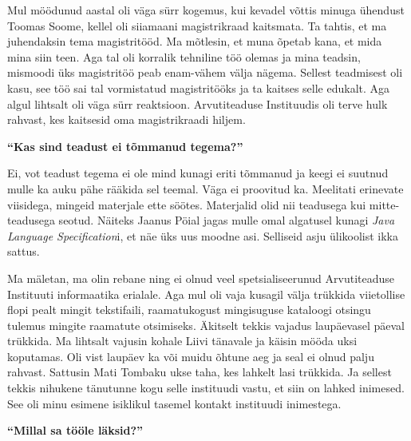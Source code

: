 Mul möödunud aastal 
oli väga sürr kogemus, kui kevadel võttis minuga ühendust Toomas Soome, kellel
oli siiamaani magistrikraad kaitsmata. Ta tahtis, et ma juhendaksin tema
magistritööd. Ma mõtlesin, et muna õpetab kana, et mida mina siin teen. Aga tal
oli korralik tehniline töö olemas ja mina teadsin, mismoodi üks magistritöö
peab enam-vähem välja nägema. Sellest teadmisest oli kasu, see töö sai tal
vormistatud magistritööks ja ta kaitses selle edukalt. Aga algul lihtsalt oli
väga sürr reaktsioon. Arvutiteaduse Instituudis oli terve hulk rahvast,
kes kaitsesid oma magistrikraadi hiljem.

\textbf{\enquote{Kas sind teadust ei tõmmanud tegema?}}

Ei, vot teadust tegema ei ole mind kunagi eriti tõmmanud ja keegi ei suutnud
mulle ka auku pähe rääkida sel teemal. Väga ei proovitud ka. Meelitati
erinevate viisidega, mingeid materjale ette söötes. Materjalid olid nii
teadusega kui mitte-teadusega seotud. Näiteks Jaanus Pöial jagas mulle omal algatusel kunagi \emph{Java Language Specification}i,
et näe üks uus moodne asi. Selliseid asju ülikoolist ikka sattus.

Ma mäletan, ma olin rebane ning ei olnud veel spetsialiseerunud Arvutiteaduse
Instituuti informaatika erialale. Aga mul oli vaja kusagil välja trükkida
viietollise flopi pealt mingit tekstifaili, raamatukogust mingisuguse kataloogi
otsingu tulemus mingite raamatute otsimiseks. Äkitselt tekkis vajadus
laupäevasel päeval trükkida. Ma lihtsalt vajusin kohale Liivi tänavale ja
käisin mööda uksi koputamas. Oli vist laupäev ka või muidu õhtune aeg ja seal
ei olnud palju rahvast. Sattusin Mati Tombaku ukse
taha, kes lahkelt lasi trükkida. Ja sellest tekkis nihukene tänutunne kogu
selle instituudi vastu, et siin on lahked inimesed. See oli minu esimene
isiklikul tasemel kontakt instituudi inimestega.

\textbf{\enquote{Millal sa tööle läksid?}} 	

